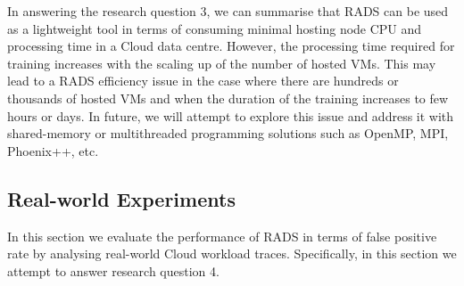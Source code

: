 In answering the research question 3, we can summarise that RADS can be used as a lightweight tool in terms of consuming minimal hosting node CPU and processing time in a Cloud data centre. However, the processing time required for training increases with the scaling up of the number of hosted VMs. This may lead to a RADS efficiency issue in the case where there are hundreds or thousands of hosted VMs and when the duration of the training increases to few hours or days. In future, we will attempt to explore this issue and address it with shared-memory or multithreaded programming solutions such as OpenMP, MPI, Phoenix++, etc.
%

\subsection{Real-world Experiments}
\label{sec:offline_analysis}
\noindent In this section we evaluate the performance of RADS in terms of false positive rate by analysing real-world Cloud workload traces. Specifically, in this section we attempt to answer research question 4.

